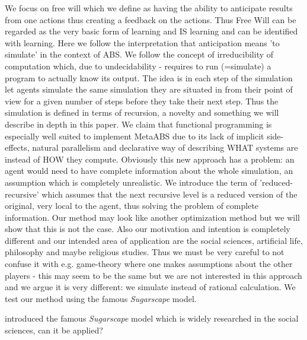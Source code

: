 \documentclass[twocolumn]{article}
\begin{document}
We focus on free will which we define as having the ability to anticipate results from one actions thus creating a feedback on the actions. Thus Free Will can be regarded as the very basic form of learning and IS learning and can be identified with learning. Here we follow the interpretation that anticipation means 'to simulate' in the context of ABS. We follow the concept of irreducibility of computation which, due to undecidability - requires to run (=simulate) a program to actually know its output. The idea is in each step of the simulation let agents simulate the same simulation they are situated in from their point of view for a given number of steps before they take their next step. Thus the simulation is defined in terms of recursion, a novelty and something we will describe in depth in this paper. We claim that functional programming is especially well suited to implement MetaABS due to its lack of implicit side-effects, natural parallelism and declarative way of describing WHAT systems are instead of HOW they compute. Obviously this new approach has a problem: an agent would need to have complete information about the whole simulation, an assumption which is completely unrealistic. We introduce the term of 'reduced-recursive' which assumes that the next recursive level is a reduced version of the original, very local to the agent, thus solving the problem of complete information.
Our method may look like another optimization method but we will show that this is not the case. Also our motivation and intention is completely different and our intended area of application are the social sciences, artificial life, philosophy and maybe religious studies. Thus we must be very careful to not confuse it with e.g. game-theory where one makes assumptions about the other players - this may seem to be the same but we are not interested in this approach and we argue it is very different: we simulate instead of rational calculation. We test our method using the famous \textit{Sugarscape} model.

\cite{epstein_growing_1996} introduced the famous \textit{Sugarscape} model which is widely researched in the social sciences, can it be applied?
\end{document}
